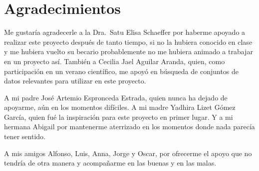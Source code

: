 
\chapter{Agradecimientos}

Me gustaría agradecerle a la Dra.\ Satu Elisa Schaeffer por haberme apoyado a realizar este proyecto después de tanto tiempo, si no la hubiera conocido en clase y me hubiera vuelto su becario probablemente no me hubiera animado a trabajar en un proyecto así. También a Cecilia Jael Aguilar Aranda, quien, como participación en un verano científico, me apoyó en búsqueda de conjuntos de datos relevantes para utilizar en este proyecto.

A mi padre José Artemio Espronceda Estrada, quien nunca ha dejado de apoyarme, aún en los momentos difíciles. A mi madre Yadhira Lizet Gómez García, quien fué la inspiración para este proyecto en primer lugar. Y a mi hermana Abigail por mantenerme aterrizado en los momentos donde nada parecía tener sentido.

A mis amigos Alfonso, Luis, Anna, Jorge y Oscar, por ofrecerme el apoyo que no tendría de otra manera y acompañarme en las buenas y en las malas.